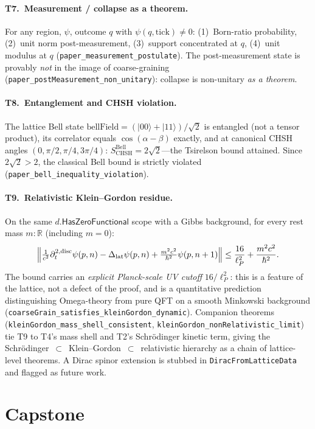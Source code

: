 \documentclass[aps,prl,twocolumn,superscriptaddress,nofootinbib,10pt]{revtex4-2}
\newcommand{\lP}{\ell_P}
\newcommand{\HasZF}{\mathsf{HasZeroFunctional}}
\newcommand{\BellField}{\mathrm{bellField}}
\begin{document}
\paragraph{T7.\ Measurement / collapse as a theorem.}
For any region, $\psi$, outcome $q$ with $\psi(q,\mathrm{tick})\ne 0$:
(1)~Born-ratio probability,
(2)~unit norm post-measurement,
(3)~support concentrated at $q$,
(4)~unit modulus at $q$
(\texttt{paper\_measurement\_postulate}). The post-measurement state
is provably \emph{not} in the image of coarse-graining
(\texttt{paper\_postMeasurement\_non\_unitary}): collapse is
non-unitary \emph{as a theorem}.

\paragraph{T8.\ Entanglement and CHSH violation.}
The lattice Bell state $\BellField=(|00\rangle+|11\rangle)/\sqrt{2}$
is entangled (not a tensor product), its correlator equals
$\cos(\alpha-\beta)$ exactly, and at canonical CHSH angles
$(0,\pi/2,\pi/4,3\pi/4)$:
$S_{\mathrm{CHSH}}^{\mathrm{Bell}}=2\sqrt{2}$---the Tsirelson
bound attained. Since $2\sqrt{2}>2$, the classical Bell bound is
strictly violated
(\texttt{paper\_bell\_inequality\_violation}).

\paragraph{T9.\ Relativistic Klein--Gordon residue.}
On the same $d.\HasZF$ scope with a Gibbs background, for every
rest mass $m:\mathbb{R}$ (including $m = 0$):
\[
\Bigl\|
  \tfrac{1}{c^{2}}\partial_{t}^{2,\mathrm{disc}}\psi(p, n)
  - \Delta_{\mathrm{lat}}\psi(p, n)
  + \tfrac{m^{2} c^{2}}{\hbar^{2}}\psi(p, n+1)
\Bigr\|
\le \frac{16}{\lP^{2}} + \frac{m^{2} c^{2}}{\hbar^{2}}.
\]
The bound carries an \emph{explicit Planck-scale UV cutoff}
$16/\lP^{2}$: this is a feature of the lattice, not a defect of the
proof, and is a quantitative prediction distinguishing Omega-theory
from pure QFT on a smooth Minkowski background
(\texttt{coarseGrain\_satisfies\_kleinGordon\_dynamic}). Companion
theorems (\texttt{kleinGordon\_mass\_shell\_consistent},
\texttt{kleinGordon\_nonRelativistic\_limit}) tie T9 to T4's mass
shell and T2's Schr\"odinger kinetic term, giving the
Schr\"odinger~$\subset$~Klein--Gordon~$\subset$~relativistic
hierarchy as a chain of lattice-level theorems. A Dirac spinor
extension is stubbed in \texttt{DiracFromLatticeData} and flagged
as future work.

\section{Capstone}
\end{document}
